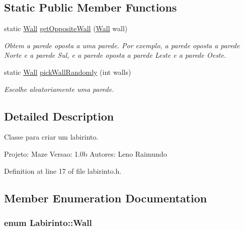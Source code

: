 \subsection*{Static Public Member Functions}
\begin{DoxyCompactItemize}
\item 
static \hyperlink{class_labirinto_ab6ffda1571ea6394c382e12b4bb4c336}{Wall} \hyperlink{class_labirinto_a567e53ede46c4341dce6e44c2e7637e4}{get\+Opposite\+Wall} (\hyperlink{class_labirinto_ab6ffda1571ea6394c382e12b4bb4c336}{Wall} wall)
\begin{DoxyCompactList}\small\item\em Obtem a parede oposta a uma parede. Por exemplo, a parede oposta a parede Norte e a parede Sul, e a parede oposta a parede Leste e a parede Oeste. \end{DoxyCompactList}\item 
static \hyperlink{class_labirinto_ab6ffda1571ea6394c382e12b4bb4c336}{Wall} \hyperlink{class_labirinto_ac75602d107390976f691cb0865f81ec5}{pick\+Wall\+Randomly} (int walls)
\begin{DoxyCompactList}\small\item\em Escolhe aleatoriamente uma parede. \end{DoxyCompactList}\end{DoxyCompactItemize}


\subsection{Detailed Description}
Classe para criar um labirinto. 

Projeto\+: Maze Versao\+: 1.\+0b Autores\+: Leno Raimundo 

Definition at line 17 of file labirinto.\+h.



\subsection{Member Enumeration Documentation}
\hypertarget{class_labirinto_ab6ffda1571ea6394c382e12b4bb4c336}{}
\subsubsection[{Wall}]{\setlength{\rightskip}{0pt plus 5cm}enum {\bf Labirinto\+::\+Wall}}\label{class_labirinto_ab6ffda1571ea6394c382e12b4bb4c336}



